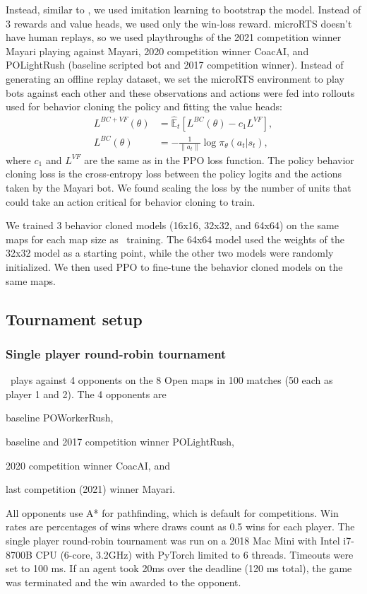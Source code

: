 \documentclass{article}
\begin{document}
Instead, similar to \citet{Vinyals2019GrandmasterLI}, we used imitation learning to
bootstrap the model. Instead of 3 rewards and value heads, we used only the win-loss
reward. microRTS doesn't have human replays, so we used playthroughs of the
2021 competition winner Mayari playing against Mayari, 2020 competition winner CoacAI, 
and POLightRush (baseline scripted bot and 2017 competition winner). Instead of
generating an offline replay dataset, we set the microRTS environment to play bots
against each other and these observations and actions were fed into rollouts used for
behavior cloning the policy and fitting the value heads:
\begin{align}
    L^{BC+VF}(\theta) &= \hat{\mathbb{E}}_t \left[ L^{BC}(\theta) - c_1 L^{VF} \right], \\
    L^{BC}(\theta) &= -\frac{1}{\|a_t\|} \log \pi_{\theta}(a_t|s_t),
\end{align}
where $c_1$ and $L^{VF}$ are the same as in the PPO loss function. The policy behavior
cloning loss is the cross-entropy loss between the policy logits and the actions taken
by the Mayari bot. We found scaling the loss by the number of units that could take an
action critical for behavior cloning to train.

We trained 3 behavior cloned models (16x16, 32x32, and 64x64) on the same maps for each
map size as \agentName\ training. The 64x64 model used the weights of the 32x32 model 
as a starting point, while the other two models were randomly initialized. We then used 
PPO to fine-tune the behavior cloned models on the same maps.

\subsection{Tournament setup}
\subsubsection{Single player round-robin tournament}
\agentName\ plays against 4 opponents on the 8 Open maps in 100 matches (50
each as player 1 and 2). The 4 opponents are
\begin{inparaenum}[(1)]
    \item baseline POWorkerRush,
    \item baseline and 2017 competition winner POLightRush,
    \item 2020 competition winner CoacAI, and
    \item last competition (2021) winner Mayari.
\end{inparaenum}
All opponents use A* for pathfinding, which is default for competitions.  Win rates are 
percentages of wins where draws count as 0.5 wins for each player. The single player 
round-robin tournament was run on a 2018 Mac Mini with Intel i7-8700B CPU (6-core, 
3.2GHz) with PyTorch limited to 6 threads. Timeouts were set to 100 ms. If
an agent took 20ms over the deadline (120 ms total), the game was terminated and the win
awarded to the opponent.
\end{document}
